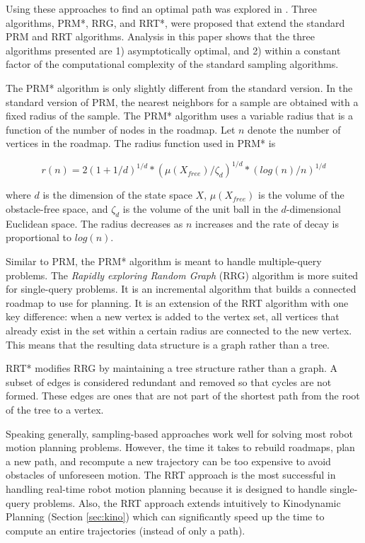 \documentclass[10pt,conference]{ieeeconf}
\begin{document}
Using these approaches to find an optimal path was explored in \cite{karaman2011sampling}. Three algorithms, PRM*, RRG, and RRT*, were proposed that extend the standard PRM and RRT algorithms. Analysis in this paper shows that the three algorithms presented are 1) asymptotically optimal, and 2) within a constant factor of the computational complexity of the standard sampling algorithms. 

The PRM* algorithm is only slightly different from the standard version. In the standard version of PRM, the nearest neighbors for a sample are obtained with a fixed radius of the sample. The PRM* algorithm uses a variable radius that is a function of the number of nodes in the roadmap. Let $n$ denote the number of vertices in the roadmap. The radius function used in PRM* is 

\begin{equation}
r(n) = 2(1+1/d)^{1/d}*(\mu(X_{free})/ \zeta_d)^{1/d} * (log(n)/n)^{1/d}
\end{equation}

where $d$ is the dimension of the state space $X$, $\mu(X_{free})$ is the volume of the obstacle-free space, and $\zeta_d$ is the volume of the unit ball in the $d$-dimensional Euclidean space. The radius decreases as $n$ increases and the rate of decay is proportional to $log(n)$.

Similar to PRM, the PRM* algorithm is meant to handle multiple-query problems. The \emph{Rapidly exploring Random Graph} (RRG) algorithm is more suited for single-query problems. It is an incremental algorithm that builds a connected roadmap to use for planning. It is an extension of the RRT algorithm with one key difference: when a new vertex is added to the vertex set, all vertices that already exist in the set within a certain radius are connected to the new vertex. This means that the resulting data structure is a graph rather than a tree.

RRT* modifies RRG by maintaining a tree structure rather than a graph. A subset of edges is considered redundant and removed so that cycles are not formed. These edges are ones that are not part of the shortest path from the root of the tree to a vertex.


Speaking generally, sampling-based approaches work well for solving most robot motion planning problems. However, the time it takes to rebuild roadmaps, plan a new path, and recompute a new trajectory can be too expensive to avoid obstacles of unforeseen motion. The RRT approach is the most successful in handling real-time robot motion planning because it is designed to handle single-query problems. Also, the RRT approach extends intuitively to Kinodynamic Planning (Section \ref{sec:kino}) which can significantly speed up the time to compute an entire trajectories (instead of only a path).
\end{document}
